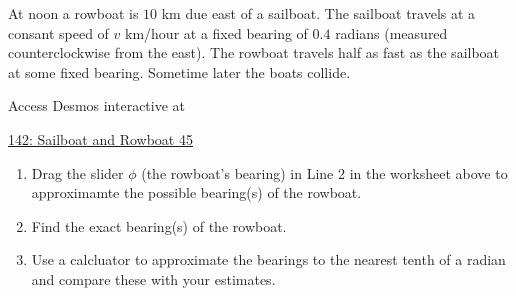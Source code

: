 \documentclass{ximera}
\begin{document}
\begin{question}  \label{Q34dfefGfd}
At noon a rowboat is $10$ km due east of a sailboat. The sailboat travels at a consant speed of $v$ km/hour at a fixed bearing of $0.4$ radians (measured counterclockwise from the east). The rowboat travels half as fast as the sailboat at some fixed bearing. Sometime later the boats collide.

 
\begin{onlineOnly}
    \begin{center}
\end{center}
\end{onlineOnly}

Access Desmos interactive at

\href{https://www.desmos.com/calculator/muqgmov9lu}{142: Sailboat and Rowboat 45}

\begin{enumerate}
\item Drag the slider $\phi$ (the rowboat's bearing) in Line 2 in the worksheet above to approximamte the possible bearing(s) of the rowboat.

\item Find the exact bearing(s) of the rowboat.

\item Use a calcluator to approximate the bearings to the nearest tenth of a radian and compare these with your estimates.



\end{enumerate}

\end{question}
\end{document}
